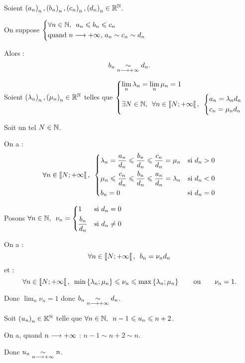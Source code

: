 \begin{prop}
Soient \(\left(a_n\right)_n,\left(b_n\right)_n,\left(c_n\right)_n,\left(d_n\right)_n\in\mathbb{R}^{\mathbb{N}}\).

On suppose \(\begin{dcases}
\quantifs{\forall n\in\N}a_n\leq b_n\leq c_n \\
\text{quand }n\to\pinf\text{, }a_n\sim c_n\sim d_n
\end{dcases}\)

Alors : \[b_n\underset{n\longrightarrow+\infty}{\sim}d_n.\]
\end{prop}

\begin{dem}
Soient \(\left(\lambda_n\right)_n,\left(\mu_n\right)_n\in\mathbb{R}^{\mathbb{N}}\) telles que \(\begin{dcases}
\lim_n\lambda_n=\lim_n\mu_n=1 \\
\quantifs{\exists N\in\N;\forall n\in\interventierie{N}{\pinf}}\begin{dcases}
    a_n=\lambda_nd_n \\
    c_n=\mu_nd_n
\end{dcases}
\end{dcases}\)

Soit un tel \(N\in\mathbb{N}\).

On a : \[\quantifs{\forall n\in\interventierie{N}{\pinf}}\begin{dcases}
\lambda_n=\dfrac{a_n}{d_n}\leq\dfrac{b_n}{d_n}\leq\dfrac{c_n}{d_n}=\mu_n &\text{si }d_n>0 \\
\mu_n\leq\dfrac{c_n}{d_n}\leq\dfrac{b_n}{d_n}\leq\dfrac{a_n}{d_n}=\lambda_n &\text{si }d_n<0 \\
b_n=0 &\text{si }d_n=0
\end{dcases}\]

Posons \(\quantifs{\forall n\in\N}\nu_n=\begin{dcases}
1 &\text{si }d_n=0 \\
\dfrac{b_n}{d_n} &\text{si }d_n\not=0
\end{dcases}\)

On a : \[\quantifs{\forall n\in\interventierie{N}{\pinf}}b_n=\nu_nd_n\] et : \[\quantifs{\forall n\in\interventierie{N}{\pinf}}\min\accol{\lambda_n;\mu_n}\leq\nu_n\leq\max\accol{\lambda_n;\mu_n}\qquad\text{ou}\qquad\nu_n=1.\]

Donc \(\lim_n\nu_n=1\) donc \(b_n\underset{n\longrightarrow+\infty}{\sim}d_n\).
\end{dem}

\begin{ex}
Soit \(\left(u_n\right)_n\in\mathbb{K}^{\mathbb{N}}\) telle que \(\quantifs{\forall n\in\N}n-1\leq u_n\leq n+2\).

On a, quand \(n\longrightarrow+\infty\) : \(n-1\sim n+2\sim n\).

Donc \(u_n\underset{n\longrightarrow+\infty}{\sim} n\).
\end{ex}

